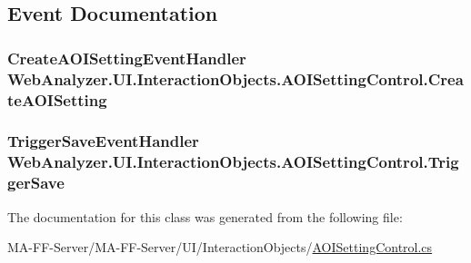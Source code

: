 \subsection{Event Documentation}
\hypertarget{class_web_analyzer_1_1_u_i_1_1_interaction_objects_1_1_a_o_i_setting_control_a655f9d463578bed0ae1ce3243eee82c0}{}
\subsubsection[{Create\+A\+O\+I\+Setting}]{\setlength{\rightskip}{0pt plus 5cm}Create\+A\+O\+I\+Setting\+Event\+Handler Web\+Analyzer.\+U\+I.\+Interaction\+Objects.\+A\+O\+I\+Setting\+Control.\+Create\+A\+O\+I\+Setting}\label{class_web_analyzer_1_1_u_i_1_1_interaction_objects_1_1_a_o_i_setting_control_a655f9d463578bed0ae1ce3243eee82c0}
\hypertarget{class_web_analyzer_1_1_u_i_1_1_interaction_objects_1_1_a_o_i_setting_control_a752fb801d539bc3df62f41bb854074e2}{}
\subsubsection[{Trigger\+Save}]{\setlength{\rightskip}{0pt plus 5cm}Trigger\+Save\+Event\+Handler Web\+Analyzer.\+U\+I.\+Interaction\+Objects.\+A\+O\+I\+Setting\+Control.\+Trigger\+Save}\label{class_web_analyzer_1_1_u_i_1_1_interaction_objects_1_1_a_o_i_setting_control_a752fb801d539bc3df62f41bb854074e2}


The documentation for this class was generated from the following file\+:\begin{DoxyCompactItemize}
\item 
M\+A-\/\+F\+F-\/\+Server/\+M\+A-\/\+F\+F-\/\+Server/\+U\+I/\+Interaction\+Objects/\hyperlink{_a_o_i_setting_control_8cs}{A\+O\+I\+Setting\+Control.\+cs}\end{DoxyCompactItemize}
